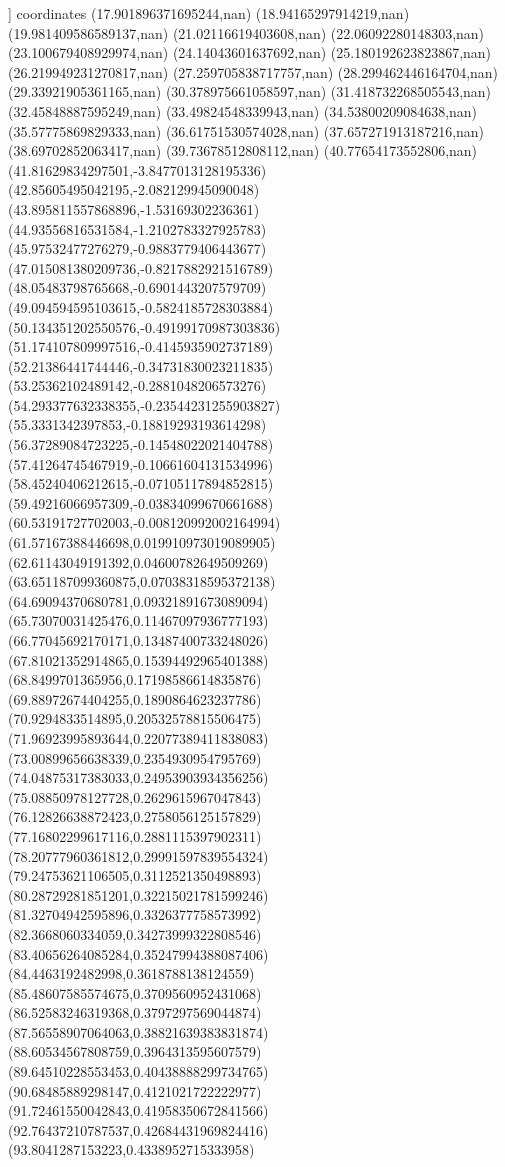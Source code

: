 ]
coordinates {%
(17.901896371695244,nan)
(18.94165297914219,nan)
(19.981409586589137,nan)
(21.02116619403608,nan)
(22.06092280148303,nan)
(23.100679408929974,nan)
(24.14043601637692,nan)
(25.180192623823867,nan)
(26.219949231270817,nan)
(27.259705838717757,nan)
(28.299462446164704,nan)
(29.33921905361165,nan)
(30.378975661058597,nan)
(31.418732268505543,nan)
(32.45848887595249,nan)
(33.49824548339943,nan)
(34.53800209084638,nan)
(35.57775869829333,nan)
(36.61751530574028,nan)
(37.657271913187216,nan)
(38.69702852063417,nan)
(39.73678512808112,nan)
(40.77654173552806,nan)
(41.81629834297501,-3.8477013128195336)
(42.85605495042195,-2.082129945090048)
(43.895811557868896,-1.53169302236361)
(44.93556816531584,-1.2102783327925783)
(45.97532477276279,-0.9883779406443677)
(47.015081380209736,-0.8217882921516789)
(48.05483798765668,-0.6901443207579709)
(49.094594595103615,-0.5824185728303884)
(50.134351202550576,-0.49199170987303836)
(51.174107809997516,-0.4145935902737189)
(52.21386441744446,-0.34731830023211835)
(53.25362102489142,-0.2881048206573276)
(54.293377632338355,-0.23544231255903827)
(55.3331342397853,-0.18819293193614298)
(56.37289084723225,-0.14548022021404788)
(57.41264745467919,-0.10661604131534996)
(58.45240406212615,-0.07105117894852815)
(59.49216066957309,-0.03834099670661688)
(60.53191727702003,-0.008120992002164994)
(61.57167388446698,0.019910973019089905)
(62.61143049191392,0.04600782649509269)
(63.651187099360875,0.07038318595372138)
(64.69094370680781,0.09321891673089094)
(65.73070031425476,0.11467097936777193)
(66.77045692170171,0.13487400733248026)
(67.81021352914865,0.15394492965401388)
(68.8499701365956,0.17198586614835876)
(69.88972674404255,0.1890864623237786)
(70.9294833514895,0.20532578815506475)
(71.96923995893644,0.22077389411838083)
(73.00899656638339,0.2354930954795769)
(74.04875317383033,0.24953903934356256)
(75.08850978127728,0.2629615967047843)
(76.12826638872423,0.2758056125157829)
(77.16802299617116,0.2881115397902311)
(78.20777960361812,0.29991597839554324)
(79.24753621106505,0.3112521350498893)
(80.28729281851201,0.32215021781599246)
(81.32704942595896,0.3326377758573992)
(82.3668060334059,0.34273999322808546)
(83.40656264085284,0.35247994388087406)
(84.4463192482998,0.3618788138124559)
(85.48607585574675,0.3709560952431068)
(86.52583246319368,0.3797297569044874)
(87.56558907064063,0.38821639383831874)
(88.60534567808759,0.3964313595607579)
(89.64510228553453,0.40438888299734765)
(90.68485889298147,0.4121021722222977)
(91.72461550042843,0.41958350672841566)
(92.76437210787537,0.42684431969824416)
(93.8041287153223,0.4338952715333958)
}
